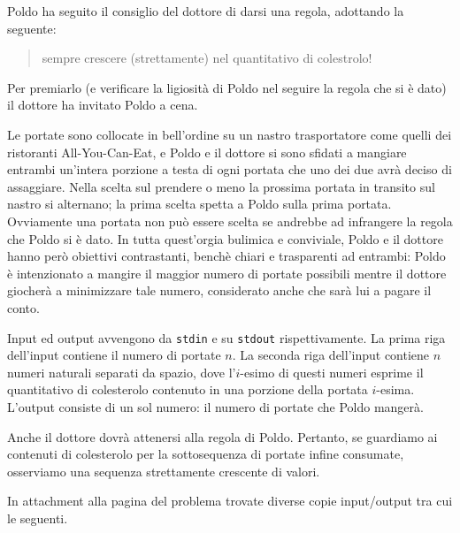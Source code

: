\renewcommand{\nomebreve}{poldo\_game}
\renewcommand{\titolo}{Poldo vuol mangiare e il dottore rema contro}

\introduzione{}

\noindent
Poldo ha seguito il consiglio del dottore di darsi una regola, adottando la seguente:

\begin{quote}
   sempre crescere (strettamente) nel quantitativo di colestrolo!
\end{quote}

Per premiarlo (e verificare la ligiosità di Poldo nel seguire la regola che si è dato) il dottore ha invitato Poldo a cena.

Le portate sono collocate in bell'ordine su un nastro trasportatore come quelli dei ristoranti All-You-Can-Eat, e Poldo e il dottore si sono sfidati a mangiare entrambi un'intera porzione a testa di ogni portata che uno dei due avrà deciso di assaggiare. Nella scelta sul prendere o meno la prossima portata in transito sul nastro si alternano; la prima scelta spetta a Poldo sulla prima portata.
Ovviamente una portata non può essere scelta se andrebbe ad infrangere la regola che Poldo si è dato.
In tutta quest'orgia bulimica e conviviale, Poldo e il dottore hanno però obiettivi contrastanti, benchè chiari e trasparenti ad entrambi:
Poldo è intenzionato a mangire il maggior numero di portate possibili mentre il dottore giocherà a minimizzare tale numero, considerato anche che sarà lui a pagare il conto.



Input ed output avvengono da \verb'stdin' e su \verb'stdout' rispettivamente.
La prima riga dell'input contiene il numero di portate $n$.
La seconda riga dell'input contiene $n$ numeri naturali separati da spazio, dove l'$i$-esimo di questi numeri esprime il quantitativo di colesterolo contenuto in una porzione della portata $i$-esima.\\

L'output consiste di un sol numero: il numero di portate che Poldo mangerà.


Anche il dottore dovrà attenersi alla regola di Poldo. Pertanto, se guardiamo ai contenuti di colesterolo per la sottosequenza di portate infine consumate, osserviamo una sequenza strettamente crescente di valori. 



In attachment alla pagina del problema trovate diverse copie input/output tra cui le seguenti.

